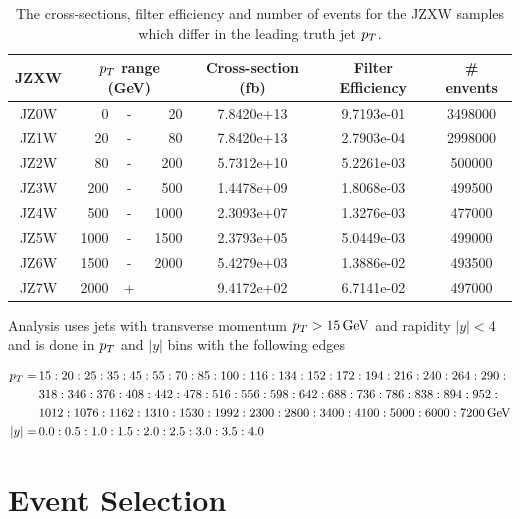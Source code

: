 \begin{table}
  \centering
  \begin{tabular}{|c|rcr|c|c|c|}
    \hline 
     JZXW & \multicolumn{3}{|c|}{$p_{T}$ range (GeV)} & Cross-section (fb) & Filter Efficiency & \# envents  \\ 
    \hline
    \hline
		 JZ0W &     0 & - &    20 & 7.8420e+13 & 9.7193e-01 & 3498000 \\ 
    \hline
		 JZ1W &    20 & - &    80 & 7.8420e+13 & 2.7903e-04 & 2998000 \\
    \hline
		 JZ2W &    80 & - &   200 & 5.7312e+10 & 5.2261e-03 & 500000  \\
    \hline
		 JZ3W &   200 & - &   500 & 1.4478e+09 & 1.8068e-03 & 499500  \\
    \hline
		 JZ4W &   500 & - &  1000 & 2.3093e+07 & 1.3276e-03 & 477000  \\
    \hline
		 JZ5W &  1000 & - &  1500 & 2.3793e+05 & 5.0449e-03 & 499000  \\
    \hline
		 JZ6W &  1500 & - &  2000 & 5.4279e+03 & 1.3886e-02 & 493500  \\
    \hline
		 JZ7W &  2000 & + &       & 9.4172e+02 & 6.7141e-02 & 497000  \\
    \hline 
  \end{tabular}
  \caption{The cross-sections, filter efficiency and number of events for the JZXW samples which differ in the leading truth jet $p_{T}$.}
  \label{tab:JZXW}
\end{table}

Analysis uses jets with transverse momentum $p_{T} > 15\,\text{GeV}$ and rapidity $|y| <
4$ and is done in $p_{T}$ and $|y|$ bins with the following edges

\small
\begin{align}
  p_{T} = \, &15:20:25:35:45:55:70:85:100:116:134:152:172:194:216:240:264:290: \nonumber \\
        &318:346:376:408:442:478:516:556:598:642:688:736:786:838:894:952: \nonumber \\
        &1012:1076:1162:1310:1530:1992:2300:2800:3400:4100:5000:6000:7200 \,\text{GeV} \nonumber \\
  |y| = \, &0.0:0.5:1.0:1.5:2.0:2.5:3.0:3.5:4.0
  \label{eq:Binning}
\end{align}
\normalsize

\section{Event Selection}

